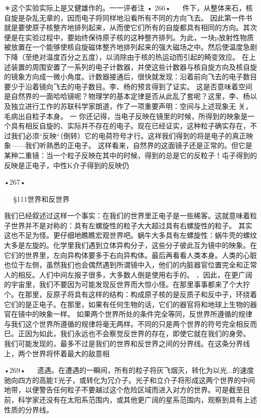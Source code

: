 ＊这个实验实际上是又健雄作的。一一评者注
•	266•
  
件下，从整体来石，核自旋是杂乱无章的，因而电子将同样地沿看所有不同的方向飞去。
因此第一件书就是要使原子核整齐地排列起来，从而使它们所有的自旋都具有相同的方向。其次便是在实验过程中，要始终保待原子核的这种整齐排列。为此，一块p放射性物质被放置在一个能够使核自旋磁体整齐地排列起来的强大磁场之中。然后使温度急剧下降（至绝对温度百分之五度），以消除由于核的热运动而引起的畸变效应。
在上述装置的周围安置了一系列的电子计数器，并使这些计数器与核自旋方向及核自旋的镜象方向成一微小角度。计数器接通后，很快就发现：沿着前向飞去的电子数目要少于沿着镜向飞去的电子数目。李、杨的预言得到了证实。
这是否意味着空间是自然界的一面哈哈镜呢？物理学的基本定律是否从此乱了套呢？这里，李、杨以及独立进行工作的苏联科学家朗道，作了一项重要声明：空间与上述现象无
	关，毛病出自粒子本身。	一
你还记得，当电子反映在镜里的时候，所得到的映象是一个具有相反自旋的、实际并不存在的电子。现在已经证实，这种粒子确实存在，不过我们必须“反映“（倒转）它的电荷符号才行。这祥我们得到的将是电子的真正映象——我们听熟悉的正电子。
这样看来，自然界的这面镜子还是正常的。但它是某种二重镜：当一个粒子反映在其中的时候，得到的总是它的反粒子！屯子得到的反映是正电子，中性K介子得到的反映仍

•267•
  






  
§111世界和反世界

我们已经叙述过这样一个事实：在我们的世界里正电子是一些稀客。这就意味着粒子世界并不是对称的：具有左螺旋性的粒子大大超过具有右螺旋性的粒子。
其实这也不足为怪。更仔细地瞧瞧宏观世界吧。蜗牛大多具有左螺旋性：蜗牛壳的螺纹大多是左旋的。化学里我们遇到立体异构分子，这些分子彼此互为镜中的映象。在它们的世界里，左向异构体要多于右向异构体。最后再看看人类本身。人类的心脏也位于左侧，虽然我们也会偶然遇到所谓镜中入，他们的内脏器官位置完全和正常人的相反。人们中间左报子很多，大多数人倒是使用右手的。
．因此，在更广阔的宇宙里，我们不要因为可能发现反世界而大惊小怪。在那里事事都来了个大拧个。在那里，反原子将具有这样的结构：构成原子核的是反质子和反中子，环绕着它们的是正电子。在那里，如果有任何生物的话，它们的器官将和地球上生物的器官在镜中的映象一样。
如果两个世界所处的条件完全等同，反世界所遵循的规律与我们这个世界所遵循的规律将毫无两样。不同的只是两个世界的符号完全相反而巳。正因为如此，我们永远也不会察觉反世界的存在，即使它就在我们的身旁。
我们可能发现的，最多不过是我们的世界和反世界之间的分界线。在这条分界线上，两个世界将怀着最大的敌意相

•269•
  
遗遇。在遭遇的一瞬间，所有的粒子将灰飞烟灭，转化为以光...的速度驰向四方的高能T光子，或转化为冗介子。光子和立介子将形成这两个世界的中间地带，以便警告任何粒子不要越过这个危险区域而进入对方的世界。可是截至目前，科学家还没有在太阳系范围内，或其他更广阔的星系范围内，观察到具有上述性质的分界线。

